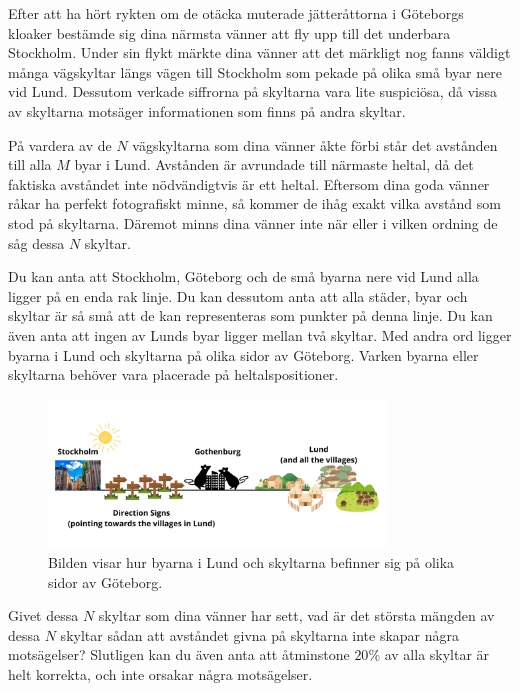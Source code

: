 \noindent
Efter att ha hört rykten om de otäcka muterade jätteråttorna i Göteborgs kloaker bestämde sig dina närmsta vänner att fly upp till det
underbara Stockholm. Under sin flykt märkte dina vänner att det märkligt nog fanns 
väldigt många vägskyltar längs vägen till Stockholm som pekade på olika små byar nere vid Lund. 
Dessutom verkade siffrorna på skyltarna vara lite suspiciösa, då vissa av skyltarna motsäger informationen som finns på andra skyltar.

På vardera av de $N$ vägskyltarna som dina vänner åkte förbi står det avstånden till alla $M$ byar i Lund. 
Avstånden är avrundade till närmaste heltal, då det faktiska avståndet inte nödvändigtvis är ett heltal. 
Eftersom dina goda vänner råkar ha perfekt fotografiskt minne, så kommer de ihåg exakt vilka avstånd som stod på skyltarna. 
Däremot minns dina vänner inte när eller i vilken ordning de såg dessa $N$ skyltar.

Du kan anta att Stockholm, Göteborg och de små byarna nere vid Lund alla ligger på en enda rak linje. 
Du kan dessutom anta att alla städer, byar och skyltar är så små att de kan representeras som punkter på denna linje.
Du kan även anta att ingen av Lunds byar ligger mellan två skyltar. Med andra ord ligger byarna i Lund och skyltarna på olika sidor av Göteborg.
Varken byarna eller skyltarna behöver vara placerade på heltalspositioner. 


\begin{centering}
  \begin{figure}[h]
      \centering
      \includegraphics[width=0.8\textwidth]{skyltar.png}
      \caption{Bilden visar hur byarna i Lund och skyltarna befinner sig på olika sidor av Göteborg.}
  \end{figure}
\end{centering}

Givet dessa $N$ skyltar som dina vänner har sett, vad är det största mängden av dessa $N$ skyltar sådan att avståndet givna på skyltarna inte skapar några motsägelser? 
Slutligen kan du även anta att åtminstone $20\%$ av alla skyltar är helt korrekta, och inte orsakar några motsägelser.

